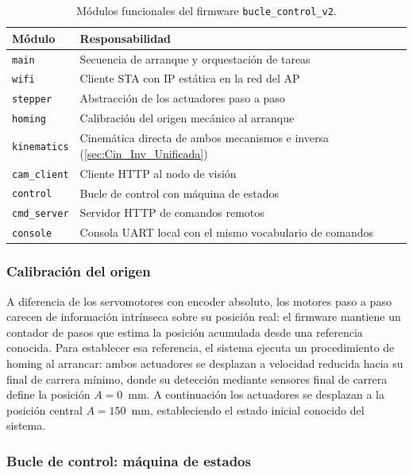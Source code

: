 \begin{table}[htbp]
    \centering
    \footnotesize
    \begin{tabular}{lp{8cm}}
        \toprule
        \textbf{Módulo} & \textbf{Responsabilidad} \\
        \midrule
        \texttt{main}        & Secuencia de arranque y orquestación de tareas \\
        \texttt{wifi}        & Cliente STA con IP estática en la red del AP \\
        \texttt{stepper}     & Abstracción de los actuadores paso a paso \\
        \texttt{homing}      & Calibración del origen mecánico al arranque \\
        \texttt{kinematics}  & Cinemática directa de ambos mecanismos e inversa (\ref{sec:Cin_Inv_Unificada}) \\
        \texttt{cam\_client} & Cliente HTTP al nodo de visión \\
        \texttt{control}     & Bucle de control con máquina de estados \\
        \texttt{cmd\_server} & Servidor HTTP de comandos remotos \\
        \texttt{console}     & Consola UART local con el mismo vocabulario de comandos \\
        \bottomrule
    \end{tabular}
    \caption{Módulos funcionales del firmware \texttt{bucle\_control\_v2}.}
    \label{tab:modulos_motor}
\end{table}

\subsubsection{Calibración del origen}
\label{sec:homing_motor}
A diferencia de los servomotores con encoder absoluto, los motores paso a paso carecen de información intrínseca sobre su posición real: el firmware mantiene un contador de pasos que estima la posición acumulada desde una referencia conocida. Para establecer esa referencia, el sistema ejecuta un procedimiento de homing al arrancar: ambos actuadores se desplazan a velocidad reducida hacia su final de carrera mínimo, donde su detección mediante sensores final de carrera define la posición $A = 0$~mm. A continuación los actuadores se desplazan a la posición central $A = 150$~mm, estableciendo el estado inicial conocido del sistema.

\subsubsection{Bucle de control: máquina de estados}
\label{sec:fsm_motor}

